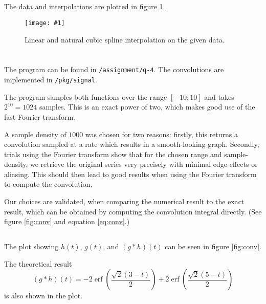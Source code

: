 \documentclass[10pt, a4paper]{article}
\newcommand{\plot}[3]{\begin{figure}[ht]\centering\texttt{[image: \#1]}\caption{#2}\label{#3}\end{figure}}
\begin{document}
  \subsection{}
  The data and interpolations are plotted in figure \ref{fig:interpolate}.

  \plot{assignment-q-3}{
    Linear and natural cubic spline interpolation on the given data.
  }{fig:interpolate}

\section{}
  \subsection{}
  The program can be found in \texttt{/assignment/q-4}. The convolutions are implemented in \texttt{/pkg/signal}.

  The program samples both functions over the range $[-10; 10]$ and takes $2^{10} = 1024$ samples. This
  is an exact power of two, which makes good use of the fast Fourier transform.

  A sample density of $1000$ was chosen for two reasons: firstly, this returns a convolution
  sampled at a rate which results in a smooth-looking graph. Secondly, trials using the Fourier
  transform show that for the chosen range and sample-density, we retrieve the original series very
  precisely with minimal edge-effects or aliasing. This should then lead to good results when
  using the Fourier transform to compute the convolution.

  Our choices are validated, when comparing the numerical result to the exact result, which can
  be obtained by computing the convolution integral directly. (See figure \ref{fig:conv} and equation
  \ref{eq:conv}.)

  \subsection{}
  The plot showing $h(t)$, $g(t)$, and $(g * h)(t)$ can be seen in figure \ref{fig:conv}.

  The theoretical result
  \begin{equation}
    \label{eq:conv}
    (g * h)(t) = - 2 \operatorname{erf}{\left(\frac{\sqrt{2} \left(3 - t\right)}{2} \right)} + 2 \operatorname{erf}{\left(\frac{\sqrt{2} \left(5 - t\right)}{2} \right)}
  \end{equation}
  is also shown in the plot.
\end{document}
